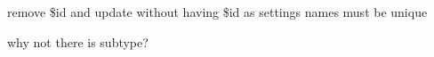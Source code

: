 
\begin{DoxyRefList}
\item[\label{todo__todo000002}%
\hypertarget{todo__todo000002}{}%
Global \hyperlink{ossn_8lib_8system_8php_a28b4c6efe594ba1a6340e6373b11fde0}{ossn\+\_\+site\+\_\+setting\+\_\+update} (\$name, \$value, \$id)]remove \$id and update without having \$id as settings names must be unique  
\item[\label{todo__todo000001}%
\hypertarget{todo__todo000001}{}%
Global \hyperlink{class_ossn_entities_a4fe96bc82545e1a91c1d87d02736e9c0}{Ossn\+Entities\+:\+:delete\+By\+Owner\+Guid} (\$guid, \$type)]why not there is subtype? 
\end{DoxyRefList}